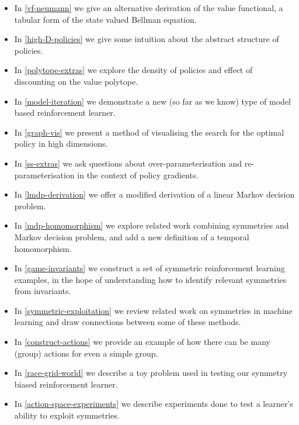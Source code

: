 \documentclass[12pt, a4paper, twoside, openright]{book}
\providecommand{\tightlist}{%
  \setlength{\itemsep}{0pt}\setlength{\parskip}{0pt}}
\begin{document}
\begin{itemize}
\tightlist
\item In \ref{vf-neumann} we give an alternative derivation of the value functional, a tabular form of the state valued Bellman equation.
\item In \ref{high-D-policies} we give some intuition about the abstract structure of policies.
\item In \ref{polytope-extras} we explore the density of policies and effect of discounting on the value polytope.
\item In \ref{model-iteration} we demonstrate a new (so far as we know) type of model based reinforcement learner.
\item In \ref{graph-vis} we present a method of visualising the search for the optimal policy in high dimensions.
\item In \ref{ss-extras} we ask questions about over-parameterisation and re-parameterisation in the context of policy gradients.
\item In \ref{lmdp-derivation} we offer a modified derivation of a linear Markov decision problem.
\item In \ref{mdp-homomorphism} we explore related work combining symmetries and Markov decision problem, and add a new definition of a temporal homomorphism.
\item In \ref{game-invariants} we construct a set of symmetric reinforcement learning examples, in the hope of understanding how to identify relevant symmetries from invariants.
\item In \ref{symmetric-exploitation} we review related work on symmetries in machine learning and draw connections between some of these methods.
\item In \ref{construct-actions} we provide an example of how there can be many (group) actions for even a simple group.
\item In \ref{race-grid-world} we describe a toy problem used in testing our symmetry biased reinforcement learner.
\item In \ref{action-space-experiments} we describe experiments done to test a learner's ability to exploit symmetries.
\end{itemize}



\end{document}

